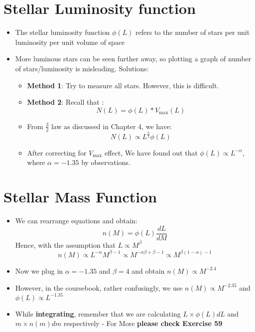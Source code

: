 \documentclass{article}
\begin{document}
\section{Stellar Luminosity function}
\begin{itemize}
\item The stellar luminosity function $\phi(L)$ refers to the number of stars per unit
luminosity per unit volume of space
\item More luminous stars can be seen further away, so plotting a graph of number of stars/luminosity is misleading. Solutions:
\begin{itemize}
\item \textbf{Method 1}: Try to measure all stars. However, this is difficult.
\item \textbf{Method 2}: Recall that :
\begin{equation}
N(L)=\phi(L)*V_\text{max}(L)
\end{equation}
\item From $\frac{3}{2}$ law as discussed in Chapter 4, we have:
\begin{equation}
N(L) \propto  L^{\frac{3}{2}}\phi(L)
\end{equation}
\item After correcting for $V_\text{max}$ effect, We have found out that $\phi(L) \propto L^{-\alpha}$, where $\alpha=-1.35$ by observations.
\end{itemize}
\end{itemize}
\section{Stellar Mass Function}
\begin{itemize}
\item We can rearrange equations and obtain:
\begin{equation}
n(M)= \phi (L) \frac{dL}{dM}
\end{equation}
Hence, with the assumption that $L \propto M^{\beta}$
\begin{equation}
n(M) \propto L^{-\alpha} M^{\beta-1} \propto M^{-\alpha\beta+\beta-1} \propto M^{\beta(1-\alpha)-1}
\end{equation}
\item Now we plug in $\alpha=-1.35$ and $\beta=4$ and obtain $n(M) \propto M^{-2.4}$
\item However, in the coursebook, rather confusingly, we use $n(M) \propto M^{-2.35}$ and $\phi(L) \propto L^{-1.35}$
\item While \textbf{integrating}, remember that we are calculating $L \times \phi(L)dL$ and $ m \times n(m)dm$ respectively - For More \textbf{please check Exercise 59} 
\end{itemize}
\end{document}
